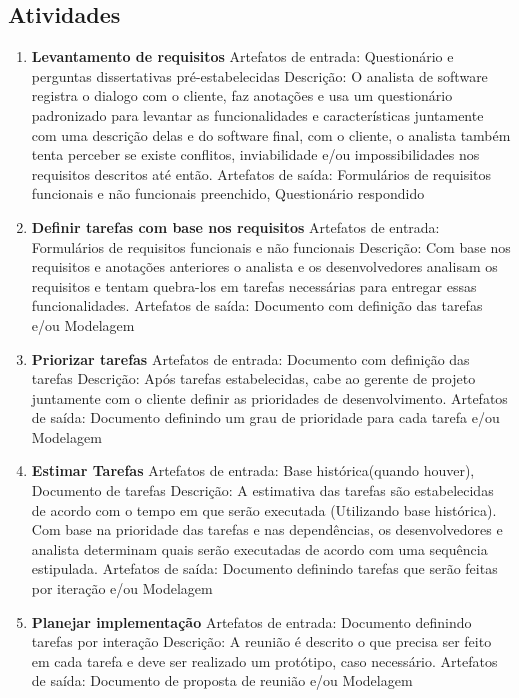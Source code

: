 \documentclass[	DIV=calc,%
							paper=a4,%
							fontsize=12pt,%
							onecolumn]{scrartcl}	 					%
\begin{document}
\subsection{Atividades}
\begin{enumerate}
	\item \textbf{Levantamento de requisitos}
	\subitem Artefatos de entrada: Questionário e perguntas dissertativas pré-estabelecidas
	\subitem Descrição: O analista de software registra o dialogo com o cliente, faz anotações e usa um questionário padronizado para levantar as funcionalidades e características juntamente com uma descrição delas e do software final, com o cliente, o analista também tenta perceber se existe conflitos, inviabilidade e/ou impossibilidades nos requisitos descritos até então.
	\subitem Artefatos de saída: Formulários de requisitos funcionais e não funcionais preenchido, Questionário respondido 
		
	\item \textbf{Definir tarefas com base nos requisitos}
	\subitem Artefatos de entrada: Formulários de requisitos funcionais e não funcionais
	\subitem Descrição: Com base nos requisitos e anotações anteriores o analista e os desenvolvedores analisam os requisitos e tentam quebra-los em tarefas necessárias para entregar essas funcionalidades.
	\subitem Artefatos de saída: Documento com definição das tarefas e/ou Modelagem

	\item \textbf{Priorizar tarefas} 
	\subitem Artefatos de entrada: Documento com definição das tarefas
	\subitem Descrição: 
	Após tarefas estabelecidas, cabe ao gerente de projeto juntamente com o cliente definir as prioridades de desenvolvimento.
	\subitem Artefatos de saída: Documento definindo um grau de prioridade para cada tarefa e/ou Modelagem
	
		\item \textbf{Estimar Tarefas}  
	\subitem Artefatos de entrada: Base histórica(quando houver), Documento de tarefas
	\subitem Descrição: A estimativa das tarefas são estabelecidas de acordo com o tempo em que serão executada (Utilizando base histórica). Com base na prioridade das tarefas e nas dependências, os desenvolvedores e analista determinam quais serão executadas de acordo com uma sequência estipulada. 
	\subitem Artefatos de saída: Documento definindo tarefas que serão feitas por iteração e/ou Modelagem
	
	
	\item \textbf{Planejar implementação}
	\subitem Artefatos de entrada: Documento definindo tarefas por interação
	\subitem Descrição: 
	A reunião é descrito o que precisa ser feito em cada tarefa e deve ser realizado um protótipo, caso necessário.
	\subitem Artefatos de saída: Documento de proposta de reunião e/ou Modelagem
	

\end{enumerate}
\end{document}
